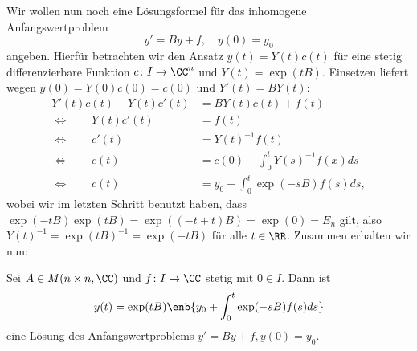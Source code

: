 Wir wollen nun noch eine Lösungsformel für das inhomogene Anfangswertproblem
\[
	y' = By + f, \quad y(0) = y_0
\]
angeben.
Hierfür betrachten wir den Ansatz $y(t) = Y(t)c(t)$ für eine stetig differenzierbare Funktion $c \colon I \rightarrow \CC^n$ und $Y(t) = \exp(tB)$.
Einsetzen liefert wegen $y(0) = Y(0)c(0) = c(0)$ und $Y'(t) = BY(t)$:
\begin{align*}
	Y'(t) c(t) + Y(t) c'(t) &= BY(t)c(t) + f(t) \\
	\Leftrightarrow \qquad Y(t) c'(t) &= f(t) \\
	\Leftrightarrow \qquad c'(t) &= Y(t)^{-1} f(t) \\
	\Leftrightarrow \qquad c(t) &= c(0) + \int_{0}^{t} Y(s)^{-1} f(x) ds \\
	\Leftrightarrow \qquad c(t) &= y_0 + \int_{0}^{t} \exp(-sB)f(s)ds,
\end{align*}
wobei wir im letzten Schritt benutzt haben, dass $\exp(-tB) \exp(tB) = \exp((-t+t)B) = \exp(0) = E_n$ gilt, also $Y(t)^{-1} = \exp(tB)^{-1} = \exp(-tB)$ für alle $t \in \RR$.
Zusammen erhalten wir nun:

\begin{satz}
	\label{satz:10.15}
	Sei $A \in M(n \times n, \CC)$ und $f \colon I \rightarrow \CC$ stetig mit $0 \in I$.
	Dann ist
	\[
		y(t) = \exp(tB) \enb{y_0 + \int_{0}^{t} \exp(-sB) f(s) ds}
	\]
	eine Lösung des Anfangswertproblems $y' = By + f, y(0) = y_0$.
\end{satz}

